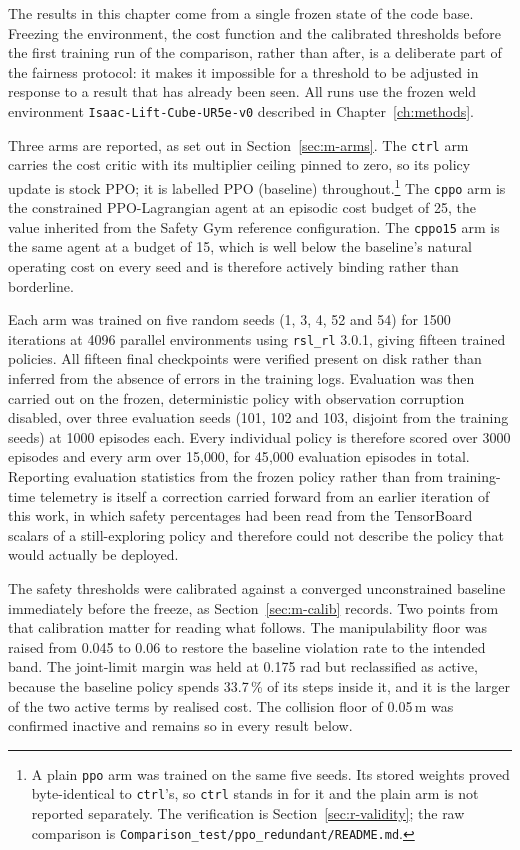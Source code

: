 The results in this chapter come from a single frozen state of the code base. Freezing the
environment, the cost function and the calibrated thresholds before the first training run of the
comparison, rather than after, is a deliberate part of the fairness protocol: it makes it
impossible for a threshold to be adjusted in response to a result that has already been seen. All
runs use the frozen weld environment \texttt{Isaac-Lift-Cube-UR5e-v0} described in
Chapter~\ref{ch:methods}.

Three arms are reported, as set out in Section~\ref{sec:m-arms}. The \texttt{ctrl} arm carries
the cost critic with its multiplier ceiling pinned to zero, so its policy update is stock PPO;
it is labelled PPO (baseline) throughout.\footnote{A plain \texttt{ppo} arm was trained on the
same five seeds. Its stored weights proved byte-identical to \texttt{ctrl}'s, so \texttt{ctrl}
stands in for it and the plain arm is not reported separately. The verification is
Section~\ref{sec:r-validity}; the raw comparison is
\texttt{Comparison\_test/ppo\_redundant/README.md}.} The \texttt{cppo} arm is the constrained
PPO-Lagrangian agent \cite{ray2019benchmarking, achiam2017cpo} at an episodic cost budget of 25,
the value inherited from the Safety Gym reference configuration. The \texttt{cppo15} arm is the
same agent at a budget of 15, which is well below the baseline's natural operating cost on every
seed and is therefore actively binding rather than borderline.

Each arm was trained on five random seeds (1, 3, 4, 52 and 54) for 1500 iterations at 4096
parallel environments using \texttt{rsl\_rl} 3.0.1, giving fifteen trained policies. All fifteen
final checkpoints were verified present on disk rather than inferred from the absence of errors
in the training logs. Evaluation was then carried out on the frozen, deterministic policy with
observation corruption disabled, over three evaluation seeds (101, 102 and 103, disjoint from
the training seeds) at 1000 episodes each. Every individual policy is therefore scored over 3000
episodes and every arm over 15{,}000, for 45{,}000 evaluation episodes in total. Reporting
evaluation statistics from the frozen policy rather than from training-time telemetry is itself
a correction carried forward from an earlier iteration of this work, in which safety percentages
had been read from the TensorBoard scalars of a still-exploring policy and therefore could not
describe the policy that would actually be deployed.

The safety thresholds were calibrated against a converged unconstrained baseline immediately
before the freeze, as Section~\ref{sec:m-calib} records. Two points from that calibration matter
for reading what follows. The manipulability floor was raised from 0.045 to 0.06 to restore the
baseline violation rate to the intended band. The joint-limit margin was held at 0.175 rad but
reclassified as active, because the baseline policy spends 33.7\,\% of its steps inside it, and
it is the larger of the two active terms by realised cost. The collision floor of 0.05\,m was
confirmed inactive and remains so in every result below.

